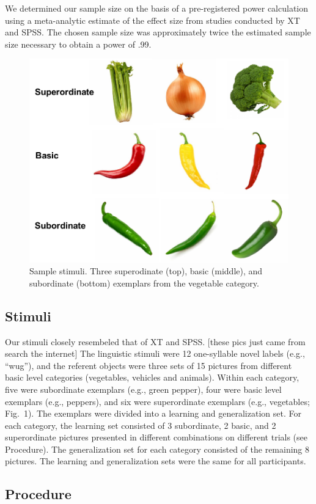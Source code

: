 \documentclass[english,floatsintext,man]{apa6}
\theoremstyle{definition}
\theoremstyle{definition}
\theoremstyle{remark}
\begin{document}
We determined our sample size on the basis of a pre-registered power
calculation using a meta-analytic estimate of the effect size from
studies conducted by XT and SPSS. The chosen sample size was
approximately twice the estimated sample size necessary to obtain a
power of .99.

\begin{figure}[t!]
 
 {\centering \includegraphics[width=0.5\linewidth]{figs/stim} 
 
 }
 
 \caption{Sample stimuli. Three superodinate (top), basic (middle), and subordinate (bottom) exemplars from the vegetable category.}\label{fig:unnamed-chunk-1}
 \end{figure}

\subsection{Stimuli}\label{stimuli}

Our stimuli closely resembeled that of XT and SPSS. {[}these pics just
came from search the internet{]} The linguistic stimuli were 12
one-syllable novel labels (e.g., \enquote{wug}), and the referent
objects were three sets of 15 pictures from different basic level
categories (vegetables, vehicles and animals). Within each category,
five were subordinate exemplars (e.g., green pepper), four were basic
level exemplars (e.g., peppers), and six were superordinate exemplars
(e.g., vegetables; Fig.~1). The exemplars were divided into a learning
and generalization set. For each category, the learning set consisted of
3 subordinate, 2 basic, and 2 superordinate pictures presented in
different combinations on different trials (see Procedure). The
generalization set for each category consisted of the remaining 8
pictures. The learning and generalization sets were the same for all
participants.

\subsection{Procedure}\label{procedure}
\end{document}
